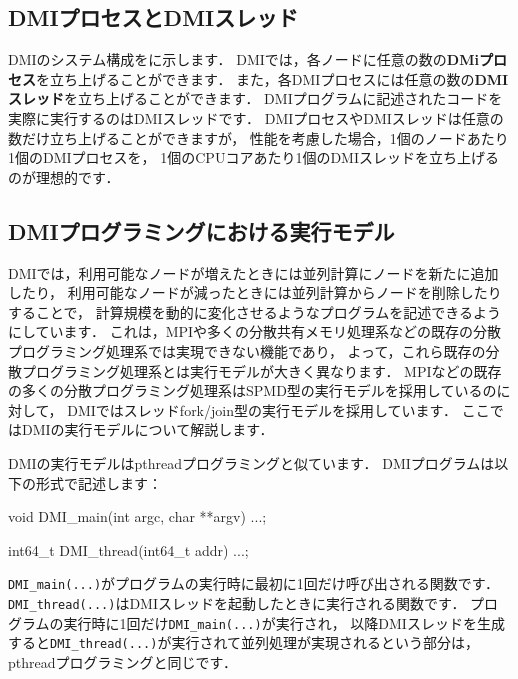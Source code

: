 \documentclass[report,12pt]{jsbook}
\begin{document}
\subsection{DMIプロセスとDMIスレッド}

DMIのシステム構成をに示します．
DMIでは，各ノードに任意の数の\textbf{DMiプロセス}を立ち上げることができます．
また，各DMIプロセスには任意の数の\textbf{DMIスレッド}を立ち上げることができます．
DMIプログラムに記述されたコードを実際に実行するのはDMIスレッドです．
DMIプロセスやDMIスレッドは任意の数だけ立ち上げることができますが，
性能を考慮した場合，1個のノードあたり1個のDMIプロセスを，
1個のCPUコアあたり1個のDMIスレッドを立ち上げるのが理想的です．

\subsection{DMIプログラミングにおける実行モデル}

DMIでは，利用可能なノードが増えたときには並列計算にノードを新たに追加したり，
利用可能なノードが減ったときには並列計算からノードを削除したりすることで，
計算規模を動的に変化させるようなプログラムを記述できるようにしています．
これは，MPIや多くの分散共有メモリ処理系などの既存の分散プログラミング処理系では実現できない機能であり，
よって，これら既存の分散プログラミング処理系とは実行モデルが大きく異なります．
MPIなどの既存の多くの分散プログラミング処理系はSPMD型の実行モデルを採用しているのに対して，
DMIではスレッドfork/join型の実行モデルを採用しています．
ここではDMIの実行モデルについて解説します．

DMIの実行モデルはpthreadプログラミングと似ています．
DMIプログラムは以下の形式で記述します：
\begin{code}
void DMI_main(int argc, char **argv)
{
  ...;
}

int64_t DMI_thread(int64_t addr)
{
  ...;
}
\end{code}
\texttt{DMI\_main(...)}がプログラムの実行時に最初に1回だけ呼び出される関数です．
\texttt{DMI\_thread(...)}はDMIスレッドを起動したときに実行される関数です．
プログラムの実行時に1回だけ\texttt{DMI\_main(...)}が実行され，
以降DMIスレッドを生成すると\texttt{DMI\_thread(...)}が実行されて並列処理が実現されるという部分は，
pthreadプログラミングと同じです．
\end{document}
